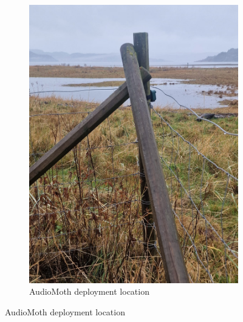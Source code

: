 \documentclass[twocolumn]{article}
\begin{document}
\begin{figure}[H]
\begin{subfigure}{0.45\textwidth}
\includegraphics[width=\textwidth]{03_deployment_location_fence.jpg}
\caption{AudioMoth deployment location}
\end{subfigure}


\end{figure}
\end{document}
